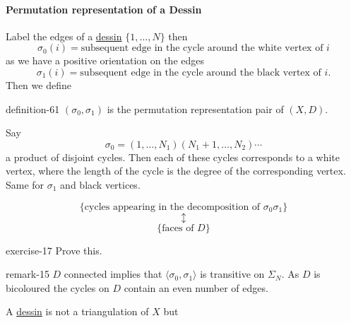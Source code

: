 \documentclass[10pt,]{book}
\numberwithin{equation}{section}
\begin{document}
\paragraph[{Permutation representation of a Dessin}]{Permutation representation of a Dessin}\hypertarget{paragraphs-16}{}
\hypertarget{p-640}{}%
Label the edges of  a \hyperref[def-dessin-denfant]{dessin} \(\{1, \ldots, N\}\) then%
\begin{equation*}
\sigma_0(i) = \text{subsequent edge in the cycle around the white vertex of }i
\end{equation*}
as we have a positive orientation on the edges%
\begin{equation*}
\sigma_1(i) = \text{subsequent edge in the cycle around the black vertex of }i\text{.}
\end{equation*}
Then we define%
\begin{definition}{}{definition-61}%
\hypertarget{p-641}{}%
\((\sigma_0, \sigma_1)\) is the permutation representation pair of \((X,D)\).%
\end{definition}
\hypertarget{p-642}{}%
Say%
\begin{equation*}
\sigma_0 = (1 , \ldots, N_1) (N_1 + 1 , \ldots, N_2)\cdots
\end{equation*}
a product of disjoint cycles. Then each of these cycles corresponds to a  white vertex, where the length of the cycle is the degree of the corresponding vertex. Same for \(\sigma_1\) and black vertices.%
\par
\hypertarget{p-643}{}%
%
\begin{equation*}
\{\text{cycles appearing in the decomposition of }\sigma_0\sigma_1\}
\end{equation*}
%
\begin{equation*}
\updownarrow
\end{equation*}
%
\begin{equation*}
\{\text{faces of }D\}
\end{equation*}
%
\begin{inlineexercise}{}{exercise-17}%
\hypertarget{p-644}{}%
Prove this.%
\end{inlineexercise}
\begin{remark}{}{remark-15}%
\hypertarget{p-645}{}%
\(D\) connected implies that \(\langle \sigma_0, \sigma_1 \rangle\) is transitive on \(\Sigma_N\). As \(D\) is bicoloured the cycles on \(D\) contain an even number of edges.%
\end{remark}
\hypertarget{p-646}{}%
A \hyperref[def-dessin-denfant]{dessin} is not a triangulation of \(X\) but%
\end{document}
